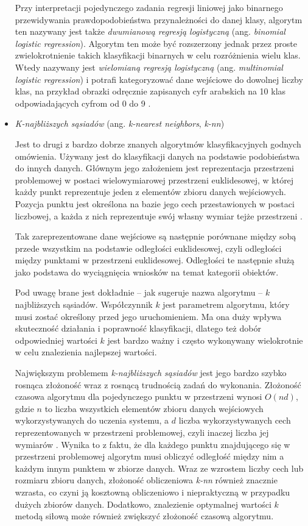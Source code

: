 \begin{itemize}
        Przy interpretacji pojedynczego zadania regresji liniowej jako binarnego przewidywania prawdopodobieństwa przynależności do danej klasy, algorytm ten nazywany jest także \emph{dwumianową regresją logistyczną} (ang. \emph{binomial logistic regression}).
        Algorytm ten może być rozszerzony jednak przez proste zwielokrotnienie takich klasyfikacji binarnych w celu rozróżnienia wielu klas.
        Wtedy nazywany jest \emph{wielomianą regresją logistyczną} (ang. \emph{multinomial logistic regression}) i potrafi kategoryzować dane wejściowe do dowolnej liczby klas, na przykład obrazki odręcznie zapisanych cyfr arabskich na 10 klas odpowiadających cyfrom od 0 do 9 \cite{palvanov2018comparisons}.

  \item \emph{K-najbliższych sąsiadów} (ang. \emph{k-nearest neighbors}, \emph{k-nn})

        Jest to drugi z bardzo dobrze znanych algorytmów klasyfikacyjnych godnych omówienia.
        Używany jest do klasyfikacji danych na podstawie podobieństwa do innych danych.
        Głównym jego założeniem jest reprezentacja przestrzeni problemowej w postaci wielowymiarowej przestrzeni euklidesowej, w której każdy punkt reprezentuje jeden z elementów zbioru danych wejściowych.
        Pozycja punktu jest określona na bazie jego cech przestawionych w postaci liczbowej, a każda z nich reprezentuje swój własny wymiar tejże przestrzeni \cite{kramer2013k}.

        Tak zareprezentowane dane wejściowe są następnie porównane między sobą przede wszystkim na podstawie odległości euklidesowej, czyli odległości między punktami w przestrzeni euklidesowej.
        Odległości te następnie służą jako podstawa do wyciągnięcia wniosków na temat kategorii obiektów.

        Pod uwagę brane jest dokładnie -- jak sugeruje nazwa algorytmu -- $k$ najbliższych sąsiadów.
        Współczynnik $k$ jest parametrem algorytmu, który musi zostać określony przed jego uruchomieniem.
        Ma ona duży wpływa skuteczność działania i poprawność klasyfikacji, dlatego też dobór odpowiedniej wartości $k$ jest bardzo ważny i często wykonywany wielokrotnie w celu znalezienia najlepszej wartości.

        Największym problemem \emph{k-najbliższych sąsiadów} jest jego bardzo szybko rosnąca złożoność wraz z rosnącą trudnością zadań do wykonania.
        Złożoność czasowa algorytmu dla pojedynczego punktu w przestrzeni wynosi $O(nd)$, gdzie $n$ to liczba wszystkich elementów zbioru danych wejściowych wykorzystywanych do uczenia systemu, a $d$ liczba wykorzystywanych cech reprezentowanych w przestrzeni problemowej, czyli inaczej liczba jej wymiarów \cite{laviale2023deep}.
        Wynika to z faktu, że dla każdego punktu znajdującego się w przestrzeni problemowej algorytm musi obliczyć odległość między nim a każdym innym punktem w zbiorze danych.
        Wraz ze wzrostem liczby cech lub rozmiaru zbioru danych, złożoność obliczeniowa \emph{k-nn} również znacznie wzrasta, co czyni ją kosztowną obliczeniowo i niepraktyczną w przypadku dużych zbiorów danych.
        Dodatkowo, znalezienie optymalnej wartości $k$ metodą siłową może również zwiększyć złożoność czasową algorytmu.


\end{itemize}
